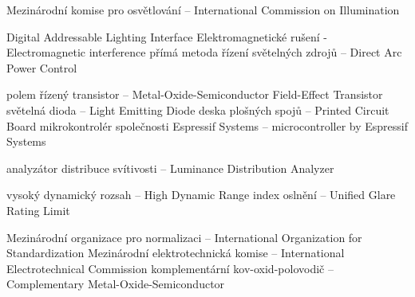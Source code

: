 


   {Mezinárodní komise pro osvětlování -- International Commission on Illumination}

  {Digital Addressable Lighting Interface}
  {Elektromagnetické rušení - Electromagnetic interference}
 {přímá metoda řízení světelných zdrojů -- Direct Arc Power Control}

 {polem řízený transistor -- Metal-Oxide-Semiconductor Field-Effect Transistor}
    {světelná dioda -- Light Emitting Diode}
    {deska plošných spojů -- Printed Circuit Board}
  {mikrokontrolér společnosti Espressif Systems -- microcontroller by Espressif Systems}

    {analyzátor distribuce svítivosti -- Luminance Distribution Analyzer}

    {vysoký dynamický rozsah -- High Dynamic Range}
   {index oslnění -- Unified Glare Rating Limit}

    {Mezinárodní organizace pro normalizaci -- International Organization for Standardization}
    {Mezinárodní elektrotechnická komise -- International Electrotechnical Commission}
   {komplementární kov-oxid-polovodič -- Complementary Metal-Oxide-Semiconductor}


